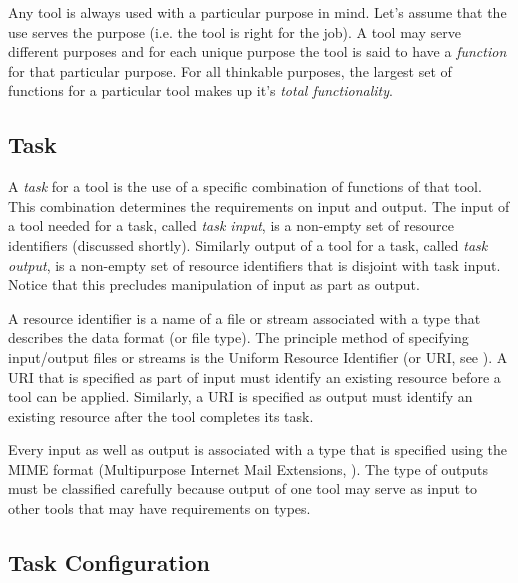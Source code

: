 \documentclass{article}
\begin{document}
   Any tool is always used with a particular purpose in mind. Let's assume that
   the use serves the purpose (i.e. the tool is right for the job). A tool may
   serve different purposes and for each unique purpose the tool is said to
   have a \emph{function} for that particular purpose. For all thinkable
   purposes, the largest set of functions for a particular tool makes up it's
   \textit{total functionality}.


  \subsection{Task}

   A \textit{task} for a tool is the use of a specific combination of functions
   of that tool. This combination determines the requirements on input and
   output. The input of a tool needed for a task, called \textit{task input},
   is a non-empty set of resource identifiers (discussed shortly). Similarly
   output of a tool for a task, called \textit{task output}, is a non-empty set
   of resource identifiers that is disjoint with task input. Notice that this
   precludes manipulation of input as part as output. 

   A resource identifier is a name of a file or stream associated with a type
   that describes the data format (or file type).  The principle method of
   specifying input/output files or streams is the Uniform Resource Identifier
   (or URI, see \cite{rfc3305}). A URI that is specified as part of input must
   identify an existing resource before a tool can be applied. Similarly, a URI
   is specified as output must identify an existing resource after the tool
   completes its task.

   Every input as well as output is associated with a type that is specified
   using the MIME format (Multipurpose Internet Mail Extensions, \cite{rfc2822}).
   The type of outputs must be classified carefully because output of one tool
   may serve as input to other tools that may have requirements on types.

  \subsection{Task Configuration} \label{concepts::task_configuration}
\end{document}

